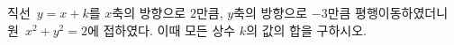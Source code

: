 직선~$y=x+k$를 $x$축의 방향으로 $2$만큼, $y$축의 방향으로 $-3$만큼 평행이동하였더니 원~$x^2+y^2=2$에 접하였다. 이때 모든 상수 $k$의 값의 합을 구하시오.
